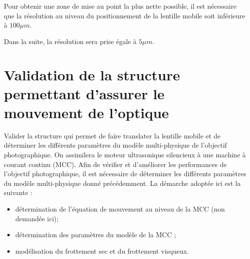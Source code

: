 


Pour obtenir une zone de mise au point la plus nette possible, il est
nécessaire que la résolution au niveau du positionnement de la lentille
mobile soit inférieure à $100\mu m$.




Dans la suite, la résolution sera prise égale à $5 \mu m$.



\section{Validation de la structure permettant d'assurer le mouvement de l'optique}\label{validation-de-la-structure-permettant-dassurer-le-mouvement-de-loptique}

\begin{obj}
Valider la structure qui permet de faire translater la lentille mobile
et de déterminer les différents paramètres du modèle multi-physique de
l'objectif photographique. On assimilera le moteur ultrasonique silencieux à une machine à courant continu (MCC).
Afin de vérifier et d'améliorer les performances de l'objectif
photographique, il est nécessaire de déterminer les différents
paramètres du modèle multi-physique donné précédemment. La démarche
adoptée ici est la suivante :

\begin{itemize}
\item
  détermination de l'équation de mouvement au niveau de la MCC (non demandée ici);
\item
  détermination des paramètres du modèle de la MCC ;
\item
  modélisation du frottement sec et du frottement visqueux.
  \end{itemize}
\end{obj}

